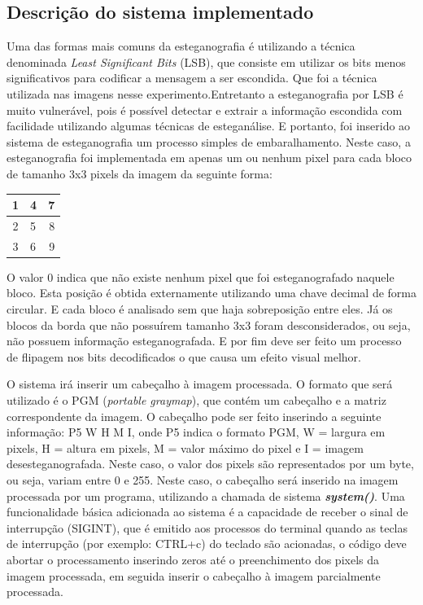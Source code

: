 \documentclass{ieee}
\begin{document}
\subsection{Descrição do sistema implementado}
Uma das formas mais comuns da esteganografia é utilizando a técnica denominada \textit{Least Significant Bits}
(LSB), que consiste em utilizar os bits menos significativos para codificar a mensagem a ser escondida. Que foi a
técnica utilizada nas imagens nesse experimento.Entretanto a esteganografia por LSB é muito vulnerável, pois é
possível detectar e extrair a informação escondida com facilidade utilizando algumas técnicas de esteganálise. 
E portanto, foi inserido ao sistema de esteganografia um processo simples de embaralhamento. Neste caso, a esteganografia foi
implementada em apenas um ou nenhum pixel para cada bloco de tamanho 3x3 pixels da imagem da
seguinte forma:

\begin{center}
\begin{tabular}{|c|l|r|}
\hline
1 & 4 & 7 \\
\hline
2 & 5 & 8\\
\hline
3 & 6 & 9\\
\hline
\end{tabular} 
\end{center}

O valor 0 indica que não existe nenhum pixel que foi esteganografado naquele bloco. Esta posição é
obtida externamente utilizando uma chave decimal de forma circular. E cada bloco é analisado sem que
haja sobreposição entre eles. Já os blocos da borda que não possuírem tamanho 3x3 foram
desconsiderados, ou seja, não possuem informação esteganografada. E por fim deve ser feito um processo de flipagem
nos bits decodificados o que causa um efeito visual melhor.

O sistema irá inserir um cabeçalho à imagem processada. O formato que será utilizado é o
PGM (\textit{portable graymap}), que contém um cabeçalho e a matriz correspondente da imagem. O cabeçalho
pode ser feito inserindo a seguinte informação: P5 W H M I, onde P5 indica o formato PGM, W = largura
em pixels, H = altura em pixels, M = valor máximo do pixel e I = imagem desesteganografada. Neste caso,
o valor dos pixels são representados por um byte, ou seja, variam entre 0 e 255. Neste caso, o cabeçalho será inserido 
na imagem processada por um programa, utilizando a chamada de sistema \textbf{\textit{system()}}.
Uma funcionalidade básica adicionada ao sistema é a capacidade de receber o sinal de interrupção (SIGINT),
que é emitido aos processos do terminal quando as teclas de interrupção (por exemplo: CTRL+c) do teclado são acionadas, 
o código deve abortar o processamento inserindo zeros até o preenchimento dos pixels da imagem processada, em
seguida inserir o cabeçalho à imagem parcialmente processada.
\end{document}
